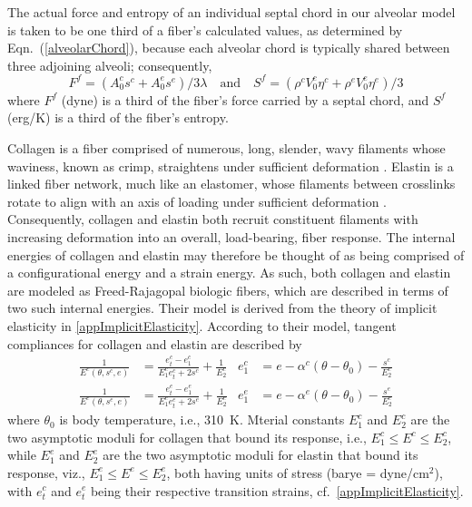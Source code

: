 The actual force and entropy of an individual septal chord in our alveolar model is taken to be one third of a fiber's calculated values, as determined by Eqn.~(\ref{alveolarChord}), because each alveolar chord is typically shared between three adjoining alveoli; consequently, 
\begin{equation}
    \label{septalChordCEs}
    F^f = ( A_0^c s^c + A_0^e s^e ) / 3 \lambda 
    \quad \text{and} \quad
    S^f = ( \rho^c V_0^c \eta^c + \rho^e V_0^e \eta^e ) / 3 
\end{equation}  
where $F^f$ (dyne) is a third of the fiber's force carried by a septal chord, and $S^f$ (erg/K) is a third of the fiber's entropy.

Collagen is a fiber comprised of numerous, long, slender, wavy filaments whose waviness, known as crimp, straightens under sufficient deformation \cite{Kastelicetal'78,FreedDoehring05}.  Elastin is a linked fiber network, much like an elastomer, whose filaments between crosslinks rotate to align with an axis of loading under sufficient deformation \cite{AaronGosline81,Urry89}.  Consequently, collagen and elastin both recruit constituent filaments with increasing deformation into an overall, load-bearing, fiber response.  The internal energies of collagen and elastin may therefore be thought of as being comprised of a configurational energy and a strain energy.  As such, both collagen and elastin are modeled as Freed-Rajagopal biologic fibers, which are described in terms of two such internal energies.  Their model is derived from the theory of implicit elasticity in \ref{appImplicitElasticity}.  According to their model, tangent compliances for collagen and elastin are described by
\begin{subequations}
    \label{septalChordModuli}
    \begin{align}
	\frac{1}{E^c (\theta , s^c , e )} & = \frac{e_t^c - e_1^c}{E_1^c e_t^c + 2s^c} + \frac{1}{E_2^c} &
	e_1^c & = e - \alpha^c (\theta - \theta_0) - \frac{s^c}{E_2^c} \\
    \frac{1}{E^e (\theta , s^e , e )} & = \frac{e_t^e - e_1^e}{E_1^e e_t^e + 2s^e} + \frac{1}{E_2^e} &
    e_1^e & = e - \alpha^e (\theta - \theta_0) - \frac{s^e}{E_2^e} 
    \end{align}
\end{subequations}
where $\theta_0$ is body temperature, i.e., 310~K.  Mterial constants $E_1^c$ and $E_2^c$ are the two asymptotic moduli for collagen that bound its response, i.e., $E_1^c \leq E^c \leq E^c_2$, while $E_1^e$ and $E_2^e$ are the two asymptotic moduli for elastin that bound its response, viz., $E^e_1 \leq E^e \leq E^e_2$, both having units of stress (barye = dyne/$\text{cm}^2$), with $e_t^c$ and $e_t^e$ being their respective transition strains, cf.\ \ref{appImplicitElasticity}. 

